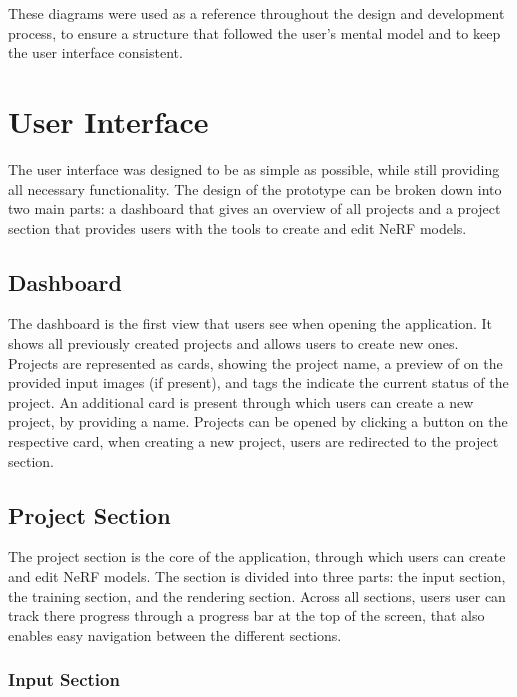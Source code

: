 These diagrams were used as a reference throughout the design and development process, to ensure a structure that followed the user's mental model and to keep the user interface consistent.

\section{User Interface}

The user interface was designed to be as simple as possible, while still providing all necessary functionality. 
The design of the prototype can be broken down into two main parts: a dashboard that gives an overview of all projects and a project section that provides users with the tools to create and edit NeRF models.

\subsection{Dashboard}

The dashboard is the first view that users see when opening the application. It shows all previously created projects and allows users to create new ones. 
Projects are represented as cards, showing the project name, a preview of on the provided input images (if present), and tags the indicate the current status of the project.
An additional card is present through which users can create a new project, by providing a name.
Projects can be opened by clicking a button on the respective card, when creating a new project, users are redirected to the project section.

\subsection{Project Section}

The project section is the core of the application, through which users can create and edit NeRF models.
The section is divided into three parts: the input section, the training section, and the rendering section.
Across all sections, users user can track there progress through a progress bar at the top of the screen, that also enables easy navigation between the different sections.

\subsubsection{Input Section}

